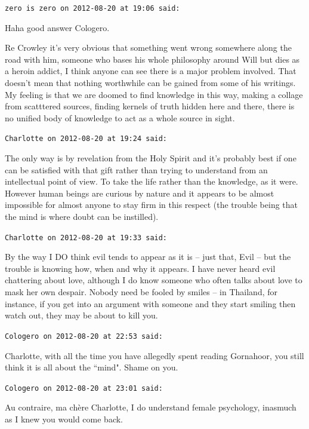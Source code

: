 \begin{footnotesize}
\begin{sffamily}
\hfill

\texttt{zero is zero on 2012-08-20 at 19:06 said: }

Haha good answer Cologero.

Re Crowley it's very obvious that something went wrong somewhere along the road with him, someone who bases his whole philosophy around Will but dies as a heroin addict, I think anyone can see there is a major problem involved. That doesn't mean that nothing worthwhile can be gained from some of his writings. My feeling is that we are doomed to find knowledge in this way, making a collage from scatttered sources, finding kernels of truth hidden here and there, there is no unified body of knowledge to act as a whole source in sight.


\hfill

\texttt{Charlotte on 2012-08-20 at 19:24 said: }

The only way is by revelation from the Holy Spirit and it's probably best if one can be satisfied with that gift rather than trying to understand from an intellectual point of view. To take the life rather than the knowledge, as it were. However human beings are curious by nature and it appears to be almost impossible for almost anyone to stay firm in this respect (the trouble being that the mind is where doubt can be instilled).


\hfill

\texttt{Charlotte on 2012-08-20 at 19:33 said: }

By the way I DO think evil tends to appear as it is – just that, Evil – but the trouble is knowing how, when and why it appears. I have never heard evil chattering about love, although I do know someone who often talks about love to mask her own despair. Nobody need be fooled by smiles – in Thailand, for instance, if you get into an argument with someone and they start smiling then watch out, they may be about to kill you.


\hfill

\texttt{Cologero on 2012-08-20 at 22:53 said: }

Charlotte, with all the time you have allegedly spent reading Gornahoor, you still think it is all about the ``mind". Shame on you.


\hfill

\texttt{Cologero on 2012-08-20 at 23:01 said: }

Au contraire, ma chère Charlotte, I do understand female psychology, inasmuch as I knew you would come back.



\end{sffamily}
\end{footnotesize}
